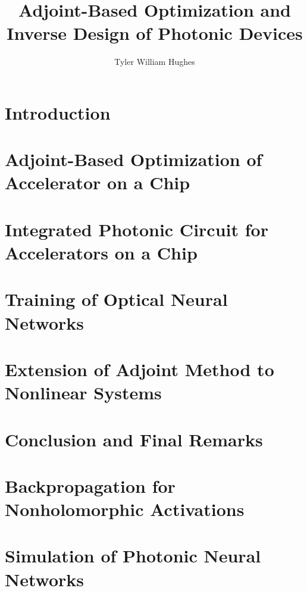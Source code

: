\documentclass{report}
\begin{document}
\title{Adjoint-Based Optimization and Inverse Design of Photonic Devices}

\author{Tyler William Hughes}

 
\beforepreface
{}


\afterpreface




\chapter{Introduction}


\chapter{Adjoint-Based Optimization of Accelerator on a Chip}


\chapter{Integrated Photonic Circuit for Accelerators on a Chip}


\chapter{Training of Optical Neural Networks}


\chapter{Extension of Adjoint Method to Nonlinear Systems}


\chapter{Conclusion and Final Remarks}



\appendix

\chapter{Backpropagation for Nonholomorphic Activations}


\chapter{Simulation of Photonic Neural Networks}





\end{document}
